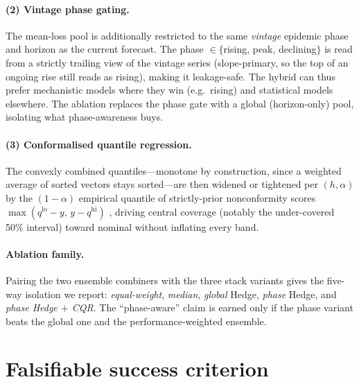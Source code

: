 \documentclass{article}
\begin{document}
\paragraph{(2) Vintage phase gating.} The mean-loss pool is additionally restricted to the same
\emph{vintage} epidemic phase and horizon as the current forecast. The phase
$\in\{$rising, peak, declining$\}$ is read from a strictly trailing view of the vintage series
(slope-primary, so the top of an ongoing rise still reads as rising), making it leakage-safe. The
hybrid can thus prefer mechanistic models where they win (e.g.\ rising) and statistical models
elsewhere. The ablation replaces the phase gate with a global (horizon-only) pool, isolating what
phase-awareness buys.

\paragraph{(3) Conformalised quantile regression.} The convexly combined quantiles---monotone by
construction, since a weighted average of sorted vectors stays sorted---are then widened or
tightened per $(h,\alpha)$ by the $(1-\alpha)$ empirical quantile of strictly-prior nonconformity
scores $\max(q^{\text{lo}}-y,\,y-q^{\text{hi}})$ \cite{romano2019cqr}, driving central coverage
(notably the under-covered 50\% interval) toward nominal without inflating every band.

\paragraph{Ablation family.} Pairing the two ensemble combiners with the three stack variants gives
the five-way isolation we report: \emph{equal-weight}, \emph{median}, \emph{global} Hedge,
\emph{phase} Hedge, and \emph{phase Hedge $+$ CQR}. The ``phase-aware'' claim is earned only if the
phase variant beats the global one and the performance-weighted ensemble.

\section{Falsifiable success criterion}
\end{document}
